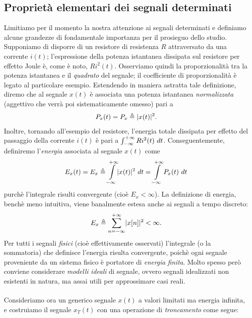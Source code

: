 \documentclass[12pt,oneside,openany]{memoir}
\numberwithin{equation}{subsection}
\DeclarePairedDelimiter{\abs}{\lvert}{\rvert}
\newcommand{\dt}{\ dt}
\begin{document}
\subsection{Propriet\`a elementari dei segnali determinati}
Limitiamo per il momento la nostra attenzione ai segnali determinati e definiamo alcune grandezze di fondamentale importanza per il prosieguo dello studio.
Supponiamo di disporre di un resistore di resistenza $R$ attraversato da una corrente $i(t)$; l'espressione della potenza istantanea dissipata sul resistore per effetto Joule \`e, come \`e noto, $Ri^2(t)$. Osserviamo quindi la proporzionalit\`a tra la potenza istantanea e il \textit{quadrato} del segnale; il coefficiente di proporzionalit\`a \`e legato al particolare esempio. Estendendo in maniera astratta tale definizione, diremo che al segnale $x(t)$ \`e associata una potenza istantanea \textit{normalizzata} (aggettivo che verr\`a poi sistematicamente omesso) pari a
\begin{equation}
	P_x(t) = P_x \triangleq \abs{x(t)}^2.
\end{equation}
Inoltre, tornando all'esempio del resistore, l'energia totale dissipata per effetto del passaggio della corrente $i(t)$ \`e pari a $\int\displaylimits_{-\infty}^{+\infty} Ri^2(t) \dt$. Conseguentemente, definiremo l'\textit{energia} associata al segnale $x(t)$ come
\begin{equation}
	E_x(t) = E_x \triangleq \int\displaylimits_{-\infty}^{+\infty} \abs{x(t)}^2 \dt = \int\displaylimits_{-\infty}^{+\infty} P_x(t) \dt
\end{equation}
purch\`e l'integrale risulti convergente (cio\`e $E_x < \infty$). La definizione di energia, bench\`e meno intuitiva, viene banalmente estesa anche ai segnali a tempo discreto:
\begin{equation}
	E_x \triangleq \sum_{n = -\infty}^{+\infty} \abs{x[n]}^2 < \infty.
\end{equation}
Per tutti i segnali \textit{fisici} (cio\`e effettivamente osservati) l'integrale (o la sommatoria) che definisce l'energia risulta convergente, poich\`e ogni segnale proveniente da un sistema fisico \`e portatore di \textit{energia finita}. Molto spesso per\`o conviene considerare \textit{modelli ideali} di segnale, ovvero segnali idealizzati non esistenti in natura, ma assai utili per approssimare casi reali.\\
\\
Consideriamo ora un generico segnale $x(t)$ a valori limitati ma energia infinita, e costruiamo il segnale $x_T(t)$ con una operazione di \textit{troncamento} come segue:
\end{document}
